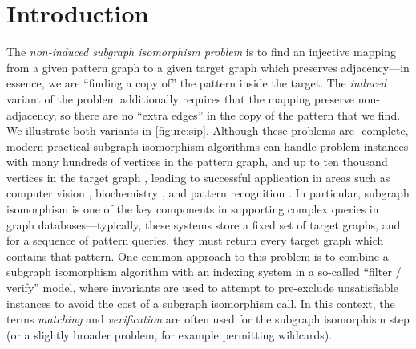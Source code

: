 \documentclass[twoside,11pt]{article}
\newcommand{\citep}[1]{\cite{#1}}
\begin{document}
\section{Introduction}\label{section:introduction}

The \emph{non-induced subgraph isomorphism problem} is to find an injective mapping from a given
pattern graph to a given target graph which preserves adjacency---in essence, we are ``finding a
copy of'' the pattern inside the target. The \emph{induced} variant of the problem additionally
requires that the mapping preserve non-adjacency, so there are no ``extra edges'' in the copy of the
pattern that we find. We illustrate both variants in \cref{figure:sip}.  Although these problems
are \NP-complete, modern practical subgraph isomorphism algorithms can handle problem instances
with many hundreds of vertices in the pattern graph, and up to ten thousand vertices in the target
graph \cite{Cordella:2004,Solnon:2010,Audemard:2014,McCreesh:2015}, leading to successful
application in areas such as computer vision \cite{Damiand:2011,Solnon:2015}, biochemistry
\cite{Giugno:2013,Carletti:2015}, and pattern recognition \citep{Conte:2004}.  In particular,
subgraph isomorphism is one of the key components in supporting complex queries in graph
databases---typically, these systems store a fixed set of target graphs, and for a sequence of
pattern queries, they must return every target graph which contains that pattern.  One common
approach to this problem is to combine a subgraph isomorphism algorithm with an indexing system in a
so-called ``filter / verify'' model, where invariants are used to attempt to pre-exclude
unsatisfiable instances to avoid the cost of a subgraph isomorphism call. In this context, the terms
\emph{matching} and \emph{verification} are often used for the subgraph isomorphism step (or a
slightly broader problem, for example permitting wildcards).
\end{document}
